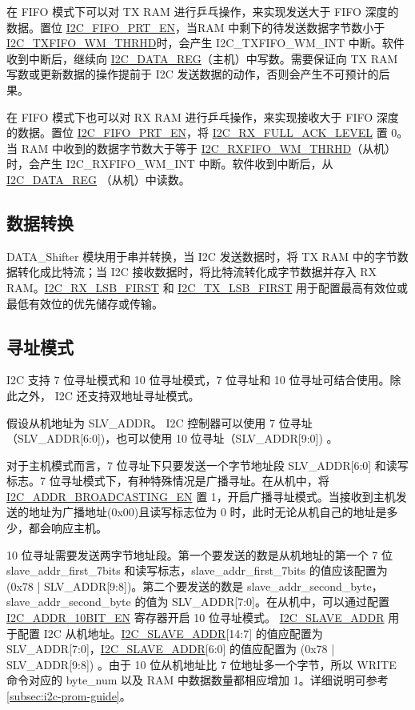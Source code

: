 \documentclass[main\_\_CN.tex]{subfiles}
\begin{document}
在 FIFO 模式下可以对 TX RAM 进行乒乓操作，来实现发送大于 FIFO 深度的数据。置位 \hyperref[fielddesc:I2CFIFOPRTEN]{I2C\_FIFO\_PRT\_EN}，当RAM 中剩下的待发送数据字节数小于 \hyperref[fielddesc:I2CTXFIFOWMTHRHD]{I2C\_TXFIFO\_WM\_THRHD}时，会产生 I2C\_TXFIFO\_WM\_INT 中断。软件收到中断后，继续向 \hyperref[regdesc:I2CDATAREG]{I2C\_DATA\_REG}（主机）中写数。需要保证向 TX RAM 写数或更新数据的操作提前于 I2C 发送数据的动作，否则会产生不可预计的后果。

在 FIFO 模式下也可以对 RX RAM 进行乒乓操作，来实现接收大于 FIFO 深度的数据。置位 \hyperref[fielddesc:I2CFIFOPRTEN]{I2C\_FIFO\_PRT\_EN}，将 \hyperref[fielddesc:I2CRXFULLACKLEVEL]{I2C\_RX\_FULL\_ACK\_LEVEL} 置 0。当 RAM 中收到的数据字节数大于等于 \hyperref[fielddesc:I2CRXFIFOWMTHRHD]{I2C\_RXFIFO\_WM\_THRHD}（从机） 时，会产生 I2C\_RXFIFO\_WM\_INT 中断。软件收到中断后，从 \hyperref[regdesc:I2CDATAREG]{I2C\_DATA\_REG} （从机）中读数。
   
\subsection{数据转换}
DATA\_Shifter 模块用于串并转换，当 I2C 发送数据时，将 TX RAM 中的字节数据转化成比特流；当 I2C 接收数据时，将比特流转化成字节数据并存入 RX RAM。\hyperref[fielddesc:I2CRXLSBFIRST]{I2C\_RX\_LSB\_FIRST} 和 \hyperref[fielddesc:I2CTXLSBFIRST]{I2C\_TX\_LSB\_FIRST} 用于配置最高有效位或最低有效位的优先储存或传输。 

\subsection{寻址模式}
\chipname{} I2C 支持 7 位寻址模式和 10 位寻址模式，7 位寻址和 10 位寻址可结合使用。除此之外，\chipname{} I2C 还支持双地址寻址模式。

假设从机地址为 SLV\_ADDR。 \chipname{} I2C 控制器可以使用 7 位寻址（SLV\_ADDR[6:0])，也可以使用 10 位寻址（SLV\_ADDR[9:0]) 。

对于主机模式而言，7 位寻址下只要发送一个字节地址段 SLV\_ADDR[6:0] 和读写标志。7 位寻址模式下，有种特殊情况是广播寻址。在从机中，将 \hyperref[fielddesc:I2CADDRBROADCASTINGEN]{I2C\_ADDR\_BROADCASTING\_EN} 置 1，开启广播寻址模式。当接收到主机发送的地址为广播地址(0x00)且读写标志位为 0 时，此时无论从机自己的地址是多少，都会响应主机。

10 位寻址需要发送两字节地址段。第一个要发送的数是从机地址的第一个 7 位 slave\_addr\_first\_7bits 和读写标志，slave\_addr\_first\_7bits 的值应该配置为 (0x78 | SLV\_ADDR[9:8])。第二个要发送的数是 slave\_addr\_second\_byte，slave\_addr\_second\_byte 的值为 SLV\_ADDR[7:0]。在从机中，可以通过配置 \hyperref[fielddesc:I2CADDR10BITEN]{I2C\_ADDR\_10BIT\_EN} 寄存器开启 10 位寻址模式。 \hyperref[fielddesc:I2CSLAVEADDR]{I2C\_SLAVE\_ADDR} 用于配置 I2C 从机地址。\hyperref[fielddesc:I2CSLAVEADDR]{I2C\_SLAVE\_ADDR}[14:7] 的值应配置为 SLV\_ADDR[7:0]，\hyperref[fielddesc:I2CSLAVEADDR]{I2C\_SLAVE\_ADDR}[6:0] 的值应配置为 (0x78 | SLV\_ADDR[9:8]) 。由于 10 位从机地址比 7 位地址多一个字节，所以 WRITE 命令对应的 byte\_num 以及 RAM 中数据数量都相应增加 1。详细说明可参考 \ref{subsec:i2c-prom-guide}。
\end{document}
